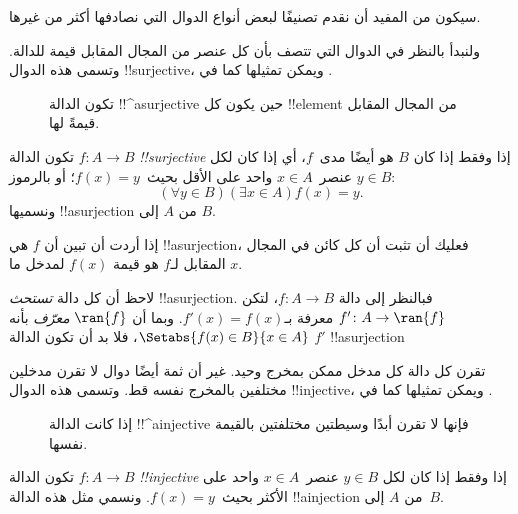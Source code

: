 \documentclass[../../../include/open-logic-section]{subfiles}
\begin{document}

\begin{explain}
سيكون من المفيد أن نقدم تصنيفًا لبعض
أنواع الدوال التي نصادفها أكثر من غيرها.

ولنبدأ بالنظر في الدوال التي تتصف بأن
كل عنصر من المجال المقابل قيمة للدالة. وتسمى
هذه الدوال !!{surjective}، ويمكن تمثيلها كما في
.

\begin{figure}
  \caption{تكون الدالة !!^a{surjective} حين يكون كل !!{element} من
    المجال المقابل قيمةً لها.}
\end{figure}
\end{explain}

\begin{defn}
تكون الدالة $f \colon A \rightarrow B$ \emph{!!{surjective}} إذا وفقط إذا كان $B$
هو أيضًا مدى~$f$، أي إذا كان لكل $y \in B$ عنصر~$x \in A$
واحد على الأقل بحيث~$f(x) = y$؛ أو بالرموز:
\[
  (\forall y \in B)(\exists x \in A)f(x) = y.
\]
ونسميها !!a{surjection} من $A$ إلى $B$.
\end{defn}

\begin{explain}
إذا أردت أن تبين أن $f$ هي !!a{surjection}، فعليك أن تثبت
أن كل كائن في المجال المقابل لـ$f$ هو قيمة $f(x)$ لمدخل ما
$x$.

لاحظ أن كل دالة \emph{تستحث} !!a{surjection}. فبالنظر إلى
دالة $f \colon A \to B$، لتكن $f' \colon A \to \ran{f}$
معرفة بـ$f'(x) = f(x)$. وبما أن $\ran{f}$ \emph{معرّف} بأنه
$\Setabs{f(x) \in B}{x \in A}$، فلا بد أن تكون الدالة $f'$
!!a{surjection}
\end{explain}

\begin{explain}
تقرن كل دالة كل مدخل ممكن بمخرج وحيد. غير أن
ثمة أيضًا دوال لا تقرن مدخلين مختلفين بالمخرج نفسه قط.
وتسمى هذه الدوال !!{injective}، ويمكن تمثيلها
كما في .
\begin{figure}
  \caption{إذا كانت الدالة !!^a{injective} فإنها لا تقرن أبدًا وسيطتين
    مختلفتين بالقيمة نفسها.}
\end{figure}
\end{explain}

\begin{defn}
تكون الدالة $f \colon A \rightarrow B$ \emph{!!{injective}} إذا وفقط إذا كان لكل
$y \in B$ عنصر~$x \in A$ واحد على الأكثر بحيث~$f(x) = y$. ونسمي
مثل هذه الدالة !!a{injection} من $A$ إلى~$B$.
\end{defn}
\end{document}
